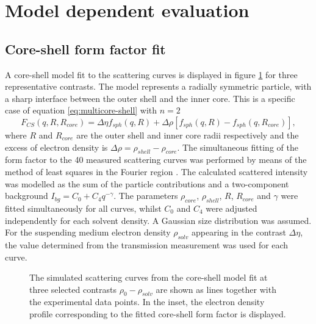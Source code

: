 \section{Model dependent evaluation}
\subsection{Core-shell form factor fit}
\label{sec:coreshell_fit}
A core-shell model fit to the scattering curves is displayed in figure \ref{fig:KiskerSAXSCoreshellFit} for three representative contrasts. The model represents a radially symmetric particle, with a sharp interface between the outer shell and the inner core. This is a specific case of equation \eqref{eq:multicore-shell} with \( n=2 \)
\begin{equation}
F_{CS}(q,R,R_{core})=\Delta\eta f_{sph}(q,R)+\Delta\rho\left[ f_{sph}(q,R)-f_{sph}(q,R_{core}) \right] ,
\label{eq:ff_cs}
\end{equation}
where \(R \) and \(R_{core} \)  are the outer shell and inner core radii respectively and the excess of electron density is \(\Delta\rho=\rho_{shell}-\rho_{core}\). The simultaneous fitting of the form factor to the 40 measured scattering curves was performed by means of the method of least squares in the Fourier region \citet{pedersen_analysis_1997}. The calculated scattered intensity was modelled as the sum of the particle contributions and a two-component background \(I_{bg}=C_0+C_4q^{-\gamma} \). The parameters \(\rho_{core}\), \(\rho_{shell}\), \(R\), \(R_{core}\) and \(\gamma\) were fitted simultaneously for all curves, whilst \( C_0 \) and \( C_4 \) were adjusted independently for each solvent density. A Gaussian size distribution was assumed. For the suspending medium electron density \( \rho_{solv} \) appearing in the contrast \( \Delta\eta \), the value determined from the transmission measurement was used for each curve.

\begin{figure}%
	\centering
		
		\caption{ The simulated scattering curves from the core-shell model fit at three selected contrasts $\rho_0-\rho_{solv}$ are shown as lines together with the experimental data points. In the inset, the electron density profile corresponding to the fitted core-shell form factor is displayed.}
		\label{fig:KiskerSAXSCoreshellFit}
\end{figure}

